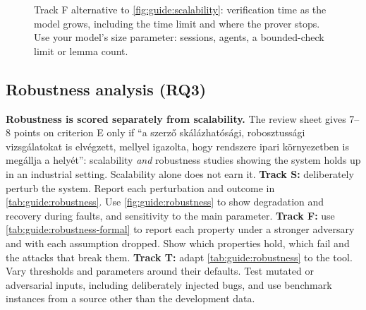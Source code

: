 \begin{figure}[!ht]
  \centering
  \caption{Track F alternative to \cref{fig:guide:scalability}: verification time as the model grows, including the time limit and where the prover stops. Use your model's size parameter: sessions, agents, a bounded-check limit or lemma count.}
  \label{fig:guide:scalability-formal}
\end{figure}

\subsection[Robustness analysis (RQ3)]{Robustness analysis (RQ3)\skimmark}\label{app:chapters:robustness}
\textbf{Robustness is scored separately from scalability.} The review sheet gives 7--8 points on criterion E only if \enquote{a szerző skálázhatósági, robosztussági vizsgálatokat is elvégzett, mellyel igazolta, hogy rendszere ipari környezetben is megállja a helyét}: scalability \emph{and} robustness studies showing the system holds up in an industrial setting. Scalability alone does not earn it.
\textbf{Track S:} deliberately perturb the system. Report each perturbation and outcome in \cref{tab:guide:robustness}. Use \cref{fig:guide:robustness} to show degradation and recovery during faults, and sensitivity to the main parameter.
\textbf{Track F:} use \cref{tab:guide:robustness-formal} to report each property under a stronger adversary and with each assumption dropped. Show which properties hold, which fail and the attacks that break them.
\textbf{Track T:} adapt \cref{tab:guide:robustness} to the tool. Vary thresholds and parameters around their defaults. Test mutated or adversarial inputs, including deliberately injected bugs, and use benchmark instances from a source other than the development data.

